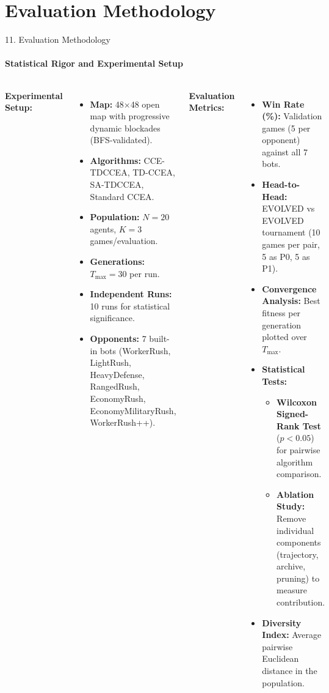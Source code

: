 \documentclass[aspectratio=169, 11pt]{beamer}
\begin{document}
\section{Evaluation Methodology}
\begin{frame}{11. Evaluation Methodology}
    \framesubtitle{Statistical Rigor and Experimental Setup}

    \begin{columns}[T]
        \textbf{\textcolor{amritaMaroon}{Experimental Setup:}}
        \begin{itemize}\small
            \item \textbf{Map:} 48$\times$48 open map with progressive dynamic blockades (BFS-validated).
            \item \textbf{Algorithms:} CCE-TDCCEA, TD-CCEA, SA-TDCCEA, Standard CCEA.
            \item \textbf{Population:} $N = 20$ agents, $K = 3$ games/evaluation.
            \item \textbf{Generations:} $T_{\max} = 30$ per run.
            \item \textbf{Independent Runs:} 10 runs for statistical significance.
            \item \textbf{Opponents:} 7 built-in bots (WorkerRush, LightRush, HeavyDefense, RangedRush, EconomyRush, EconomyMilitaryRush, WorkerRush++).
        \end{itemize}

        \textbf{\textcolor{amritaMaroon}{Evaluation Metrics:}}
        \begin{itemize}\small
            \item \textbf{Win Rate (\%):} Validation games (5 per opponent) against all 7 bots.
            \item \textbf{Head-to-Head:} EVOLVED vs EVOLVED tournament (10 games per pair, 5 as P0, 5 as P1).
            \item \textbf{Convergence Analysis:} Best fitness per generation plotted over $T_{\max}$.
            \item \textbf{Statistical Tests:}
            \begin{itemize}\footnotesize
                \item \textbf{Wilcoxon Signed-Rank Test} ($p < 0.05$) for pairwise algorithm comparison.
                \item \textbf{Ablation Study:} Remove individual components (trajectory, archive, pruning) to measure contribution.
            \end{itemize}
            \item \textbf{Diversity Index:} Average pairwise Euclidean distance in the population.
        \end{itemize}
    \end{columns}
\end{frame}
\end{document}
